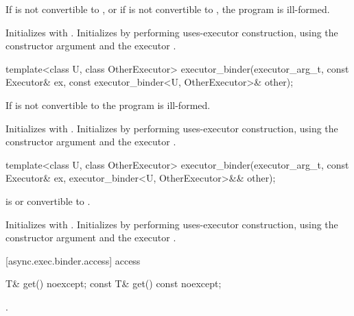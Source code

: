 \begin{itemdescr}
\pnum
\requires If  is not convertible to , or if  is not convertible to , the program is ill-formed.

\pnum
\effects Initializes  with . Initializes  by performing uses-executor construction, using the constructor argument  and the executor .
\end{itemdescr}

\begin{itemdecl}
template<class U, class OtherExecutor>
  executor_binder(executor_arg_t, const Executor& ex,
    const executor_binder<U, OtherExecutor>& other);
\end{itemdecl}

\begin{itemdescr}
\pnum
\requires If  is not convertible to  the program is ill-formed.

\pnum
\effects Initializes  with . Initializes  by performing uses-executor construction, using the constructor argument  and the executor .
\end{itemdescr}

\begin{itemdecl}
template<class U, class OtherExecutor>
  executor_binder(executor_arg_t, const Executor& ex,
    executor_binder<U, OtherExecutor>&& other);
\end{itemdecl}

\begin{itemdescr}
\pnum
\requires {} is  or convertible to .

\pnum
\effects Initializes  with . Initializes  by performing uses-executor construction, using the constructor argument  and the executor .
\end{itemdescr}



[async.exec.binder.access]{ access}

%
\begin{itemdecl}
T& get() noexcept;
const T& get() const noexcept;
\end{itemdecl}

\begin{itemdescr}
\pnum
\returns {}.
\end{itemdescr}

